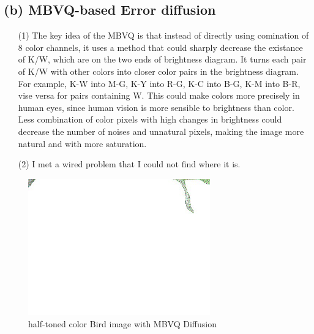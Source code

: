 \documentclass[12pt]{article}
\begin{document}
\subsection*{(b) MBVQ-based Error diffusion} 
\begin{itemize}
	\item[(1)] The key idea of the MBVQ is that instead of directly using comination of 8 color channels, it uses a method that could sharply decrease the existance of K/W, which are on the two ends of brightness diagram.  It turns each pair of K/W with other colors into closer color pairs in the brightness diagram. For example, K-W into M-G, K-Y into R-G, K-C into B-G, K-M into B-R, vise versa for pairs containing W. This could make colors more precisely in human eyes, since human vision is more sensible to brightness than color. Less combination of color pixels with high changes in brightness could decrease the number of noises and unnatural pixels, making the image more natural and with more saturation. 
	
	\item[(2)] I met a wired problem that I could not find where it is.
\end{itemize}
\begin{figure}[H]
	\centering
	\includegraphics[width=0.7\textwidth]{BirdMBVQ.jpg}
	\caption{half-toned color Bird image with MBVQ Diffusion}
	\label{fig:Bird_MBVQ}
\end{figure}
\end{document}
